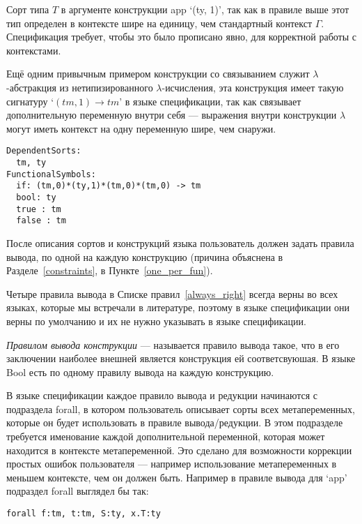 Сорт типа $T$ в аргументе конструкции app `(ty, 1)', так как в правиле выше этот тип определен в контексте шире на единицу, чем стандартный контекст $\Gamma$. Спецификация требует, чтобы это было прописано явно, для корректной работы с контекстами.

Ещё одним привычным примером конструкции со связыванием служит $\lambda$-абстракция из нетипизированного $\lambda$-исчисления, эта конструкция имеет такую сигнатуру `$(tm, 1) \rightarrow tm$' в языке спецификации, так как связывает дополнительную переменную внутри себя --- выражения внутри конструкции $\lambda$ могут иметь контекст на одну переменную шире, чем снаружи.

\begin{lstlisting}[label={lst_bool_funs}, caption={Конструкции и сорты языка Bool, описанные в языке спецификации},captionpos=b, frame=single, float]
DependentSorts:
  tm, ty
FunctionalSymbols:
  if: (tm,0)*(ty,1)*(tm,0)*(tm,0) -> tm
  bool: ty
  true : tm
  false : tm
\end{lstlisting}

\hfill

После описания сортов и конструкций языка пользователь должен задать правила вывода, по одной на каждую конструкцию (причина объяснена в Разделе~\ref{constraints}, в Пункте~\ref{one_per_fun}).

Четыре правила вывода в Списке правил~\ref{always_right} всегда верны во всех языках, которые мы встречали в литературе, поэтому в языке спецификации они верны по умолчанию и их не нужно указывать в языке спецификации.

\textit{Правилом вывода конструкции} --- называется правило вывода такое, что в его заключении наиболее внешней является конструкция ей соответсвуюшая. В языке Bool есть по одному правилу вывода на каждую конструкцию.

В языке спецификации каждое правило вывода и редукции начинаются с подраздела forall, в котором пользователь описывает сорты всех метапеременных, которые он будет использовать в правиле вывода/редукции. В этом подразделе требуется именование каждой дополнительной переменной, которая может находится в контексте метапеременной. Это сделано для возможности коррекции простых ошибок пользователя --- например использование метапеременных в меньшем контексте, чем он должен быть. Например в правиле вывода для `app' подраздел forall выглядел бы так:
\begin{lstlisting}
forall f:tm, t:tm, S:ty, x.T:ty
\end{lstlisting}

